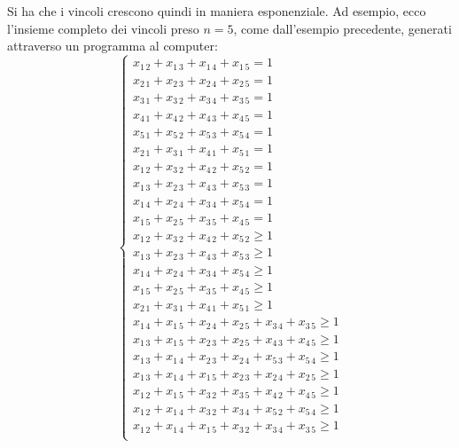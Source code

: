 \documentclass[a4paper,11pt]{article}
\begin{document}
Si ha che i vincoli crescono quindi in maniera esponenziale.
Ad esempio, ecco l'insieme completo dei vincoli preso $n=5$, come dall'esempio precedente, generati attraverso un programma al computer:
$$
\begin{cases}
	x_{1 \, 2} + x_{1 \, 3} + x_{1 \, 4} + x_{1 \, 5} = 1 \\
	x_{2 \, 1} + x_{2 \, 3} + x_{2 \, 4} + x_{2 \, 5} = 1 \\
	x_{3 \, 1} + x_{3 \, 2} + x_{3 \, 4} + x_{3 \, 5} = 1 \\
	x_{4 \, 1} + x_{4 \, 2} + x_{4 \, 3} + x_{4 \, 5} = 1 \\
	x_{5 \, 1} + x_{5 \, 2} + x_{5 \, 3} + x_{5 \, 4} = 1 \\
	x_{2 \, 1} + x_{3 \, 1} + x_{4 \, 1} + x_{5 \, 1} = 1 \\
	x_{1 \, 2} + x_{3 \, 2} + x_{4 \, 2} + x_{5 \, 2} = 1 \\
	x_{1 \, 3} + x_{2 \, 3} + x_{4 \, 3} + x_{5 \, 3} = 1 \\
	x_{1 \, 4} + x_{2 \, 4} + x_{3 \, 4} + x_{5 \, 4} = 1 \\
	x_{1 \, 5} + x_{2 \, 5} + x_{3 \, 5} + x_{4 \, 5} = 1 \\
	x_{1 \, 2} + x_{3 \, 2} + x_{4 \, 2} + x_{5 \, 2} \geq 1 \\
	x_{1 \, 3} + x_{2 \, 3} + x_{4 \, 3} + x_{5 \, 3} \geq 1 \\
	x_{1 \, 4} + x_{2 \, 4} + x_{3 \, 4} + x_{5 \, 4} \geq 1 \\
	x_{1 \, 5} + x_{2 \, 5} + x_{3 \, 5} + x_{4 \, 5} \geq 1 \\
	x_{2 \, 1} + x_{3 \, 1} + x_{4 \, 1} + x_{5 \, 1} \geq 1 \\
	x_{1 \, 4} + x_{1 \, 5} + x_{2 \, 4} + x_{2 \, 5} + x_{3 \, 4} + x_{3 \, 5} \geq 1 \\
	x_{1 \, 3} + x_{1 \, 5} + x_{2 \, 3} + x_{2 \, 5} + x_{4 \, 3} + x_{4 \, 5} \geq 1 \\
	x_{1 \, 3} + x_{1 \, 4} + x_{2 \, 3} + x_{2 \, 4} + x_{5 \, 3} + x_{5 \, 4} \geq 1 \\
	x_{1 \, 3} + x_{1 \, 4} + x_{1 \, 5} + x_{2 \, 3} + x_{2 \, 4} + x_{2 \, 5} \geq 1 \\
	x_{1 \, 2} + x_{1 \, 5} + x_{3 \, 2} + x_{3 \, 5} + x_{4 \, 2} + x_{4 \, 5} \geq 1 \\
	x_{1 \, 2} + x_{1 \, 4} + x_{3 \, 2} + x_{3 \, 4} + x_{5 \, 2} + x_{5 \, 4} \geq 1 \\
	x_{1 \, 2} + x_{1 \, 4} + x_{1 \, 5} + x_{3 \, 2} + x_{3 \, 4} + x_{3 \, 5} \geq 1 \\

\end{cases}$$
\end{document}
